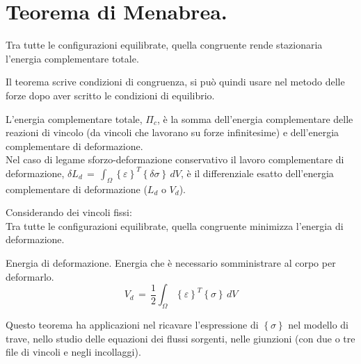 \section{Teorema di Menabrea.}

\begin{enunciatoBox}
   Tra tutte le configurazioni equilibrate, quella congruente rende stazionaria l'energia complementare totale.
\end{enunciatoBox}
 Il teorema scrive condizioni di congruenza, si può quindi usare nel metodo delle forze dopo aver scritto le condizioni di equilibrio.

 \begin{definizioneBox}
     L'energia complementare totale, $\Pi_c$, è la somma dell'energia complementare delle reazioni di vincolo (da vincoli che lavorano su forze infinitesime) e dell'energia complementare di deformazione.\\
     Nel caso di legame sforzo-deformazione conservativo il lavoro complementare di deformazione, $\delta L_d \, = \, \int_{\Omega} \left\{\varepsilon \right\}^T \left\{\delta\sigma \right\} \, dV$, è il differenziale esatto dell'energia complementare di deformazione ($L_d$ o $V_d$).
 \end{definizioneBox}

 Considerando dei vincoli fissi:\\
 Tra tutte le configurazioni equilibrate, quella congruente minimizza l'energia di deformazione.\\

 \begin{definizioneBox}
     Energia di deformazione. Energia che è necessario somministrare al corpo per deformarlo.
     \begin{equation*}
         V_d \, = \, \frac{1}{2}\int_{\Omega} \left\{\varepsilon \right\}^T \left\{\sigma \right\} \, dV
     \end{equation*}
 \end{definizioneBox}

 Questo teorema ha applicazioni nel ricavare l'espressione di $\left\{\sigma \right\}$ nel modello di trave, nello studio delle equazioni dei flussi sorgenti, nelle giunzioni (con due o tre file di vincoli e negli incollaggi).

 
 
 

